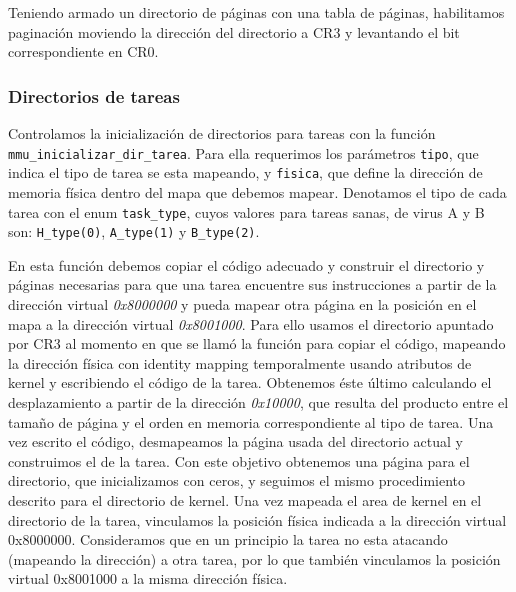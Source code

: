 Teniendo armado un directorio de páginas con una tabla de páginas, habilitamos paginación moviendo la dirección del directorio a CR3 y levantando el bit correspondiente en CR0.\\


\subsubsection{Directorios de tareas}
\label{sec-paginacion-tareas} 
Controlamos la inicialización de directorios para tareas con la función \verb|mmu_inicializar_dir_tarea|. 
Para ella requerimos los parámetros \verb|tipo|, que indica el tipo de tarea se esta mapeando, y \verb|fisica|, que define la dirección de memoria física dentro del mapa que debemos mapear. 
Denotamos el tipo de cada tarea con el enum \verb|task_type|, cuyos valores para tareas sanas, de virus A y B son: \verb|H_type(0)|, \verb|A_type(1)| y \verb|B_type(2)|.

En esta función debemos copiar el código adecuado y construir el directorio y páginas necesarias para que una tarea encuentre sus instrucciones a partir de la dirección virtual \textit{0x8000000} y pueda mapear otra página en la posición en el mapa a la dirección virtual \textit{0x8001000}.
Para ello usamos el directorio apuntado por CR3 al momento en que se llamó la función para copiar el código, mapeando la dirección física con identity mapping temporalmente usando atributos de kernel y escribiendo el código de la tarea. Obtenemos éste último calculando el desplazamiento a partir de la dirección \textit{0x10000}, que resulta del producto entre el tamaño de página y el orden en memoria correspondiente al tipo de tarea.
Una vez escrito el código, desmapeamos la página usada del directorio actual y construimos el de la tarea. 
Con este objetivo obtenemos una página para el directorio, que inicializamos con ceros, y seguimos el mismo procedimiento descrito para el directorio de kernel.
Una vez mapeada el area de kernel en el directorio de la tarea, vinculamos la posición física indicada a la dirección virtual 0x8000000. 
Consideramos que en un principio la tarea no esta atacando (mapeando la dirección) a otra tarea, por lo que también vinculamos la posición virtual 0x8001000 a la misma dirección física.\\



